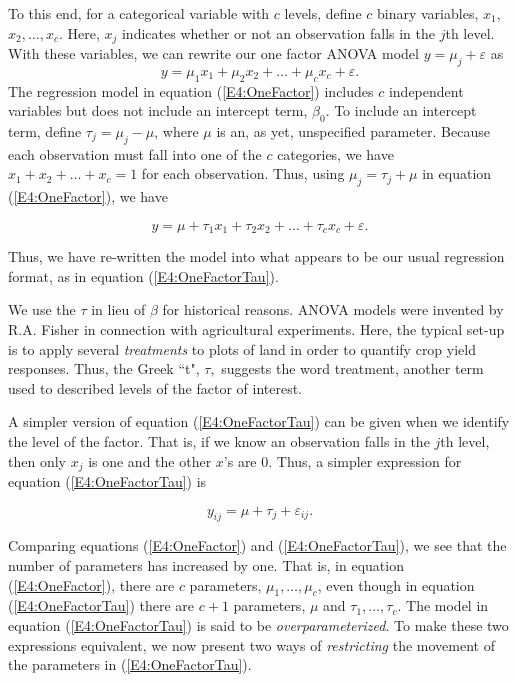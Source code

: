 To this end, for a categorical variable with $c$ levels, define $c$
binary variables, $x_1,$ $x_2,\ldots ,x_{c}$. Here, $x_{j}$
indicates whether or not an observation falls in the $j$th level.
With these variables, we can rewrite our one factor ANOVA model $
y=\mu_{j}+ \varepsilon$ as
\begin{equation}\label{E4:OneFactor}
y=\mu_1x_1+\mu_2x_2+\ldots +\mu_cx_{c}+\varepsilon.
\end{equation}
The regression model in equation (\ref{E4:OneFactor}) includes $c$
independent variables but does not include an intercept term, $\beta
_0$. To include an intercept term, define $\tau_{j}=\mu_{j}-\mu $,
where $\mu $ is an, as yet, unspecified parameter. Because each
observation must fall into one of the $c$ categories, we have
$x_1+x_2+\ldots +x_{c}=1$ for each observation. Thus, using $\mu
_{j} = \tau_j + \mu $ in equation (\ref{E4:OneFactor}), we have

\begin{equation}\label{E4:OneFactorTau}
y=\mu +\tau_1x_1+\tau_2x_2+\ldots +\tau_{c}x_{c}+\varepsilon.
\end{equation}

\noindent Thus, we have re-written the model into what appears to be
our usual regression format, as in equation (\ref{E4:OneFactorTau}).

We use the $\tau $ in lieu of $\beta $ for historical reasons. ANOVA
models were invented by R.A. Fisher in connection with agricultural
experiments. Here, the typical set-up is to apply several
\textit{treatments} to plots of land in order to quantify crop yield
responses. Thus, the Greek ``t", $\tau ,$ suggests the word
treatment, another term used to described levels of the factor of
interest.

A simpler version of equation (\ref{E4:OneFactorTau}) can be given
when we identify the level of the factor. That is, if we know an
observation falls in the $j$th level, then only $x_{j}$ is one and
the other $x$'s are 0. Thus, a simpler expression for equation
(\ref{E4:OneFactorTau}) is

\begin{equation*}
y_{ij}=\mu +\tau_{j} + \varepsilon_{ij}.
\end{equation*}

Comparing equations (\ref{E4:OneFactor}) and
(\ref{E4:OneFactorTau}), we see that the number of parameters
has increased by one. That is, in equation (\ref{E4:OneFactor}), there are $c$ parameters, $%
\mu_1,\ldots ,\mu_c$, even though in equation
(\ref{E4:OneFactorTau}) there are $c+1$ parameters, $\mu $ and $\tau
_1,\ldots ,\tau_c$. The model in equation (\ref{E4:OneFactorTau}) is
said to be \textit{overparameterized}. To make these two expressions
equivalent, we now present two ways of \textit{restricting} the
movement of the parameters in (\ref{E4:OneFactorTau}).


